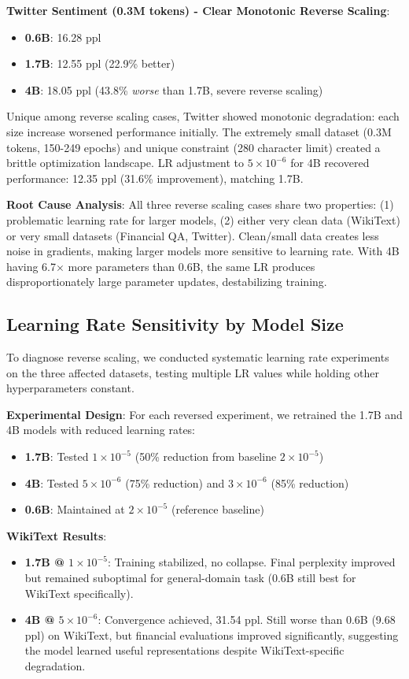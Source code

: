 \textbf{Twitter Sentiment (0.3M tokens) - Clear Monotonic Reverse Scaling}:
\begin{itemize}
\item \textbf{0.6B}: 16.28 ppl
\item \textbf{1.7B}: 12.55 ppl (22.9\% better)
\item \textbf{4B}: 18.05 ppl (43.8\% \textit{worse} than 1.7B, severe reverse scaling)
\end{itemize}

Unique among reverse scaling cases, Twitter showed monotonic degradation: each size increase worsened performance initially. The extremely small dataset (0.3M tokens, 150-249 epochs) and unique constraint (280 character limit) created a brittle optimization landscape. LR adjustment to $5 \times 10^{-6}$ for 4B recovered performance: 12.35 ppl (31.6\% improvement), matching 1.7B.

\textbf{Root Cause Analysis}: All three reverse scaling cases share two properties: (1) problematic learning rate for larger models, (2) either very clean data (WikiText) or very small datasets (Financial QA, Twitter). Clean/small data creates less noise in gradients, making larger models more sensitive to learning rate. With 4B having 6.7$\times$ more parameters than 0.6B, the same LR produces disproportionately large parameter updates, destabilizing training.

\subsection{Learning Rate Sensitivity by Model Size}

To diagnose reverse scaling, we conducted systematic learning rate experiments on the three affected datasets, testing multiple LR values while holding other hyperparameters constant.

\textbf{Experimental Design}: For each reversed experiment, we retrained the 1.7B and 4B models with reduced learning rates:
\begin{itemize}
\item \textbf{1.7B}: Tested $1 \times 10^{-5}$ (50\% reduction from baseline $2 \times 10^{-5}$)
\item \textbf{4B}: Tested $5 \times 10^{-6}$ (75\% reduction) and $3 \times 10^{-6}$ (85\% reduction)
\item \textbf{0.6B}: Maintained at $2 \times 10^{-5}$ (reference baseline)
\end{itemize}

\textbf{WikiText Results}:
\begin{itemize}
\item \textbf{1.7B @ $1 \times 10^{-5}$}: Training stabilized, no collapse. Final perplexity improved but remained suboptimal for general-domain task (0.6B still best for WikiText specifically).
\item \textbf{4B @ $5 \times 10^{-6}$}: Convergence achieved, 31.54 ppl. Still worse than 0.6B (9.68 ppl) on WikiText, but financial evaluations improved significantly, suggesting the model learned useful representations despite WikiText-specific degradation.
\end{itemize}

